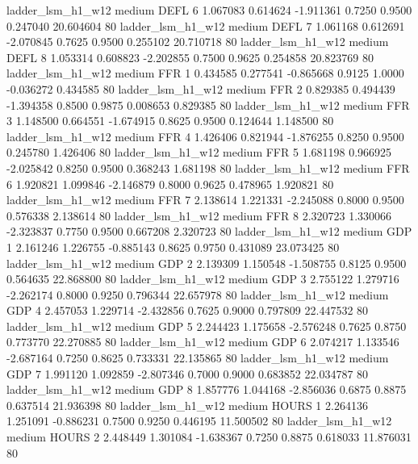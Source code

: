      ladder_lsm_h1_w12     medium     DEFL                 6  1.067083 0.614624 -1.911361 0.7250 0.9500  0.247040   20.604604 80
     ladder_lsm_h1_w12     medium     DEFL                 7  1.061168 0.612691 -2.070845 0.7625 0.9500  0.255102   20.710718 80
     ladder_lsm_h1_w12     medium     DEFL                 8  1.053314 0.608823 -2.202855 0.7500 0.9625  0.254858   20.823769 80
     ladder_lsm_h1_w12     medium      FFR                 1  0.434585 0.277541 -0.865668 0.9125 1.0000 -0.036272    0.434585 80
     ladder_lsm_h1_w12     medium      FFR                 2  0.829385 0.494439 -1.394358 0.8500 0.9875  0.008653    0.829385 80
     ladder_lsm_h1_w12     medium      FFR                 3  1.148500 0.664551 -1.674915 0.8625 0.9500  0.124644    1.148500 80
     ladder_lsm_h1_w12     medium      FFR                 4  1.426406 0.821944 -1.876255 0.8250 0.9500  0.245780    1.426406 80
     ladder_lsm_h1_w12     medium      FFR                 5  1.681198 0.966925 -2.025842 0.8250 0.9500  0.368243    1.681198 80
     ladder_lsm_h1_w12     medium      FFR                 6  1.920821 1.099846 -2.146879 0.8000 0.9625  0.478965    1.920821 80
     ladder_lsm_h1_w12     medium      FFR                 7  2.138614 1.221331 -2.245088 0.8000 0.9500  0.576338    2.138614 80
     ladder_lsm_h1_w12     medium      FFR                 8  2.320723 1.330066 -2.323837 0.7750 0.9500  0.667208    2.320723 80
     ladder_lsm_h1_w12     medium      GDP                 1  2.161246 1.226755 -0.885143 0.8625 0.9750  0.431089   23.073425 80
     ladder_lsm_h1_w12     medium      GDP                 2  2.139309 1.150548 -1.508755 0.8125 0.9500  0.564635   22.868800 80
     ladder_lsm_h1_w12     medium      GDP                 3  2.755122 1.279716 -2.262174 0.8000 0.9250  0.796344   22.657978 80
     ladder_lsm_h1_w12     medium      GDP                 4  2.457053 1.229714 -2.432856 0.7625 0.9000  0.797809   22.447532 80
     ladder_lsm_h1_w12     medium      GDP                 5  2.244423 1.175658 -2.576248 0.7625 0.8750  0.773770   22.270885 80
     ladder_lsm_h1_w12     medium      GDP                 6  2.074217 1.133546 -2.687164 0.7250 0.8625  0.733331   22.135865 80
     ladder_lsm_h1_w12     medium      GDP                 7  1.991120 1.092859 -2.807346 0.7000 0.9000  0.683852   22.034787 80
     ladder_lsm_h1_w12     medium      GDP                 8  1.857776 1.044168 -2.856036 0.6875 0.8875  0.637514   21.936398 80
     ladder_lsm_h1_w12     medium    HOURS                 1  2.264136 1.251091 -0.886231 0.7500 0.9250  0.446195   11.500502 80
     ladder_lsm_h1_w12     medium    HOURS                 2  2.448449 1.301084 -1.638367 0.7250 0.8875  0.618033   11.876031 80
